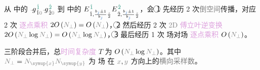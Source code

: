 {\one} 从  中的 $\xint{{}^{}_{\mathcolor{gray}{-}}}{10}{g}^{\;\! \textcolor{PineGreen}{\hat{1}}}_{\;\! \hat{1} \mathcolor{gray}{0}} \xint{{}^{}_{\mathcolor{gray}{-}}}{10}{g}^{\;\! \textcolor{PineGreen}{\hat{2}}}_{\;\! \hat{2} \mathcolor{gray}{0}}$ 到  中的 ${E}^{\;\! \textcolor{PineGreen}{\hat{1}}}_{\;\! \hat{1}, \frac{b_{\textcolor{NavyBlue}{j}} \pm 1}{b_{\textcolor{NavyBlue}{j}}} \frac{ \mathcolor{gray}{z} }{ 2 }} {E}^{\;\! \textcolor{PineGreen}{\hat{2}}}_{\;\! \hat{2}, \frac{b_{\textcolor{NavyBlue}{j}} \pm 1}{b_{\textcolor{NavyBlue}{j}}} \frac{ \mathcolor{gray}{z} }{ 2 }}$，会 \textcircled{1} 先经历 2 次\textcolor{gray}{倒空间}传播，对应 2 次 \textcolor{Plum}{逐点乘积} $2 O \left( \textcolor{gray}{N_\perp} \right) = O \left( \textcolor{gray}{N_\perp} \right)$，\textcircled{2} 然后经历 2 次 \textcolor{gray}{2D} \textcolor{Plum}{傅立叶逆变换} $2 O \left( \textcolor{gray}{N_\perp} \log \textcolor{gray}{N_\perp} \right) = O \left( \textcolor{gray}{N_\perp} \log \textcolor{gray}{N_\perp} \right)$，\textcircled{3} 最后经历 1 次 \textcolor{NavyBlue}{场}对\textcolor{NavyBlue}{场} \textcolor{Plum}{逐点乘积} $O \left( \textcolor{gray}{N_\perp} \right)$。

三阶段合并后，总\textcolor{Plum}{时间复杂度} $T$ 为 $O \left( \textcolor{gray}{N_\perp} \log \textcolor{gray}{N_\perp} \right)$。其中 $\textcolor{gray}{N_\perp} = \textcolor{gray}{N_{\symup{x}}} \textcolor{gray}{N_{\symup{y}}}$ 为 \textcolor{NavyBlue}{场} 在 $\textcolor{gray}{x}, \textcolor{gray}{y}$ 方向上的\textcolor{gray}{横向采样数}。

